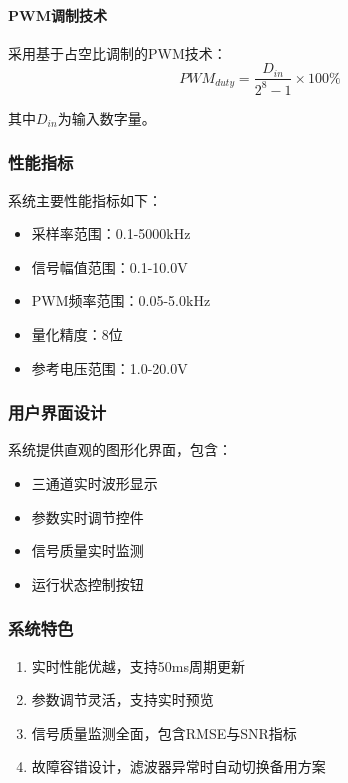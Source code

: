 \documentclass[12pt]{article}
\begin{document}
\paragraph{PWM调制技术}
采用基于占空比调制的PWM技术：
\begin{equation}
PWM_{duty} = \frac{D_{in}}{2^8-1} \times 100\%
\end{equation}

其中$D_{in}$为输入数字量。

\subsubsection{性能指标}
系统主要性能指标如下：
\begin{itemize}
    \item 采样率范围：0.1-5000kHz
    \item 信号幅值范围：0.1-10.0V
    \item PWM频率范围：0.05-5.0kHz
    \item 量化精度：8位
    \item 参考电压范围：1.0-20.0V
\end{itemize}

\subsubsection{用户界面设计}
系统提供直观的图形化界面，包含：
\begin{itemize}
    \item 三通道实时波形显示
    \item 参数实时调节控件
    \item 信号质量实时监测
    \item 运行状态控制按钮
\end{itemize}

\subsubsection{系统特色}
\begin{enumerate}
    \item 实时性能优越，支持50ms周期更新
    \item 参数调节灵活，支持实时预览
    \item 信号质量监测全面，包含RMSE与SNR指标
    \item 故障容错设计，滤波器异常时自动切换备用方案
\end{enumerate}
\end{document}
